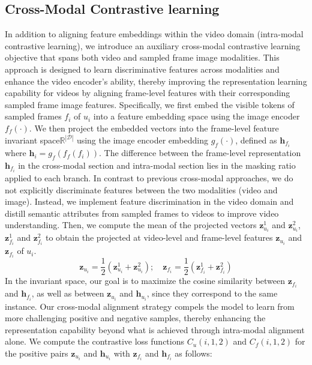 \subsection{Cross-Modal Contrastive learning}
\label{sec:cross-modal}
In addition to aligning feature embeddings within the video domain (intra-modal contrastive learning), we introduce an auxiliary cross-modal contrastive learning objective that spans both video and sampled frame image modalities. This approach is designed to learn discriminative features across modalities and enhance the video encoder's ability, thereby improving the representation learning capability for videos by aligning frame-level features with their corresponding sampled frame image features. Specifically, we first embed the visible tokens of sampled frames \(f_i\) of \(u_i\) into a feature embedding space using the image encoder \(f_{f}(\cdot)\). We then project the embedded vectors into the frame-level feature invariant space$\mathbb{R}^{|\mathcal{D}|}$ using the image encoder embedding \(g_{f}(\cdot)\), defined as \(\textbf{h}_{f_i}\) where $\textbf{h}_i = g_{f}(f_{f}(f_i))$. The difference between the frame-level representation \(\textbf{h}_{f_i} \) in the cross-modal section and intra-modal section lies in the masking ratio applied to each branch. In contrast to previous cross-modal approaches, we do not explicitly discriminate features between the two modalities (video and image). Instead, we implement feature discrimination in the video domain and distill semantic attributes from sampled frames to videos to improve video understanding. Then, we compute the mean of the projected vectors $\textbf{z}_{u_i}^{1}$ and $\textbf{z}_{u_i}^{2}$, $\textbf{z}_{f_i}^{1}$ and $\textbf{z}_{f_i}^{2}$ to obtain the projected at video-level and frame-level features $\textbf{z}_{u_i}$ and $\textbf{z}_{f_i}$ of $u_i$. 
\vspace{-3pt}
\begin{equation}
\textbf{z}_{u_i} = \frac{1}{2} (\textbf{z}_{u_i}^{1} + \textbf{z}_{u_i}^{2}) ; \quad \textbf{z}_{f_i} = \frac{1}{2} (\textbf{z}_{f_i}^{1} + \textbf{z}_{f_i}^{2})
\end{equation}
In the invariant space, our goal is to maximize the cosine similarity between \(\textbf{z}_{f_i}\) and \(\textbf{h}_{f_i}\), as well as between \(\textbf{z}_{u_i}\) and \(\textbf{h}_{u_i}\), since they correspond to the same instance. Our cross-modal alignment strategy compels the model to learn from more challenging positive and negative samples, thereby enhancing the representation capability beyond what is achieved through intra-modal alignment alone. We compute the contrastive loss functions \(C_u(i, 1, 2)\) and \(C_f(i, 1, 2)\) for the positive pairs \(\textbf{z}_{u_i}\) and \(\textbf{h}_{u_i}\) with \(\textbf{z}_{f_i}\) and \(\textbf{h}_{f_i}\) as follows:
